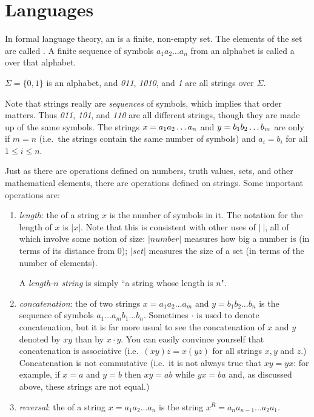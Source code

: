 \section{Languages}
In formal language theory, an  is a finite, non-empty set.
The elements of the set are called .
A finite sequence of symbols $a_1a_2\ldots a_n$ from an alphabet is called a  over that alphabet.  

\smallskip

\begin{example}
$\Sigma = \{0,1\}$ is an alphabet, and {\em 011}, 
{\em 1010}, and {\em 1} are all strings over $\Sigma$.
\end{example}

\smallskip

Note that strings really are \emph{sequences} of symbols, which implies that order matters.
Thus {\em 011}, {\em 101}, and {\em 110} are all different strings, though they are made up of the same symbols.
The strings $x=\mbox{{${a}_1{a}_2\ldots {a}_{n}$}}$ and $y=\mbox{{${b}_1{b}_2\ldots {b}_{m}$}}$ are  only if $m=n$ (i.e.\ the strings contain the same number of symbols) and $a_i=b_i$ for all $1 \leq i \leq n$.

Just as there are operations defined on numbers, truth values, sets, and other mathematical elements, there are operations defined on strings.
Some important operations are:
\begin{enumerate}
\item {\em length}: the  of a string $x$ is the number of symbols in it.
The notation for the length of $x$ is $|x|$.
Note that this is consistent with other uses of $|\ |$, all of which involve some notion of size: $|number|$ measures how big a number is (in terms of its distance from 0);  $|set|$ measures the size of a set (in terms of the number of elements).

A {\em length-$n$ string} is simply ``a string whose length is $n$".

\item {\em concatenation}: the  of two strings $x=a_1 a_2\ldots a_m$ and $y=b_1b_2\ldots b_n$ is the sequence of symbols $a_1\ldots a_mb_1\ldots b_n$.
Sometimes $\cdot$ is used to denote concatenation, but it is far more usual to see the concatenation of $x$ and $y$ denoted by $xy$ than by $x\cdot y$.
You can easily convince yourself that concatenation is associative (i.e.\ $(xy)z = x(yz)$ for all strings $x,y$ and $z$.)
Concatenation is not commutative (i.e.\ it is not always true that $xy = yx$:
for example, if $x=a$ and $y=b$ then $xy=ab$ while $yx=ba$ and, as discussed above, these strings are not equal.)

\item {\em reversal}: the  of a string $x=a_1a_2\ldots a_n$ is the string $x^R = a_na_{n-1}\ldots a_2a_1$.
\end{enumerate}

